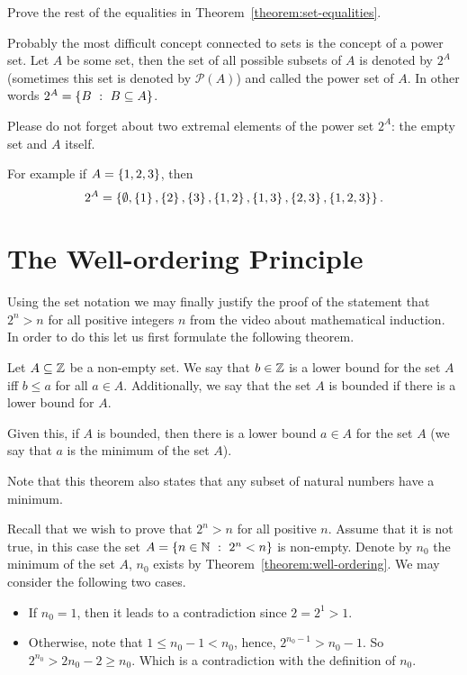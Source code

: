 \begin{exercise}
\label{exercise:set-equalities}
  Prove the rest of the equalities in Theorem~\ref{theorem:set-equalities}.
\end{exercise}

Probably the most difficult concept connected to sets is
the concept of a power set. Let $A$ be some set, then the set of
all possible subsets of $A$ is denoted by $2^A$ (sometimes this set is denoted
by $\mathcal{P}(A)$) and called the power set of $A$. In other words $2^A =
\set[B \subseteq A]{B}$.


\begin{warning}
  Please do not forget about two extremal elements of the power set $2^A$: the
  empty set and $A$ itself.
\end{warning}

\noindent For example if $A = \set{1, 2, 3}$, then
\[
  2^A = \set{\emptyset, \set{1}, \set{2}, \set{3}, \set{1, 2},
  \set{1, 3}, \set{2, 3}, \set{1, 2, 3}}.
\]

\section{The Well-ordering Principle}
Using the set notation we may finally justify the proof of the statement
that $2^n > n$ for all positive integers $n$ from the video about mathematical
induction. In order to do this let us first formulate the following theorem.
\begin{theorem}
\label{theorem:well-ordering}
  Let $A \subseteq {\mathbb{Z}}$ be a non-empty set. We say that $b \in {\mathbb{Z}}$ is a lower
  bound for the set $A$ iff $b \le a$ for all $a \in A$. Additionally, we say
  that the set $A$ is bounded if there is a lower bound for $A$.

  Given this, if $A$ is bounded, then there is a lower bound $a \in A$ for the set $A$
  (we say that $a$ is the minimum of the set $A$).
\end{theorem}
Note that this theorem also states that any subset of natural numbers have a
minimum.

Recall that we wish to prove that $2^n > n$ for all positive $n$.
Assume that it is not true, in this case the set
$A = \set[2^n < n]{n \in \N}$ is non-empty. Denote by $n_0$ the minimum of the
set $A$, $n_0$ exists by Theorem~\ref{theorem:well-ordering}. We may consider
the following two cases.
\begin{itemize}
  \item If $n_0 = 1$, then it leads to a contradiction since $2 = 2^1 > 1$.
  \item Otherwise, note that $1 \le n_0 - 1 < n_0$, hence,
    $2^{n_0 - 1} > n_0 - 1$. So $2^{n_0} > 2n_0 - 2 \ge n_0$. Which is a
    contradiction with the definition of $n_0$.
\end{itemize}

